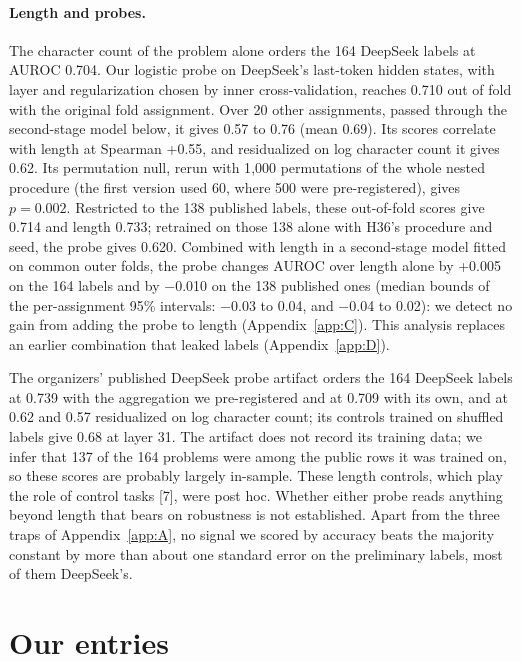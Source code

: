 \documentclass{article}
\begin{document}
\paragraph{Length and probes.} The character count of the problem alone orders the 164 DeepSeek labels at AUROC 0.704. Our logistic probe on DeepSeek's last-token hidden states, with layer and regularization chosen by inner cross-validation, reaches 0.710 out of fold with the original fold assignment. Over 20 other assignments, passed through the second-stage model below, it gives 0.57 to 0.76 (mean 0.69). Its scores correlate with length at Spearman +0.55, and residualized on log character count it gives 0.62. Its permutation null, rerun with 1{,}000 permutations of the whole nested procedure (the first version used 60, where 500 were pre-registered), gives $p = 0.002$. Restricted to the 138 published labels, these out-of-fold scores give 0.714 and length 0.733; retrained on those 138 alone with H36's procedure and seed, the probe gives 0.620. Combined with length in a second-stage model fitted on common outer folds, the probe changes AUROC over length alone by +0.005 on the 164 labels and by $-$0.010 on the 138 published ones (median bounds of the per-assignment 95\% intervals: $-$0.03 to 0.04, and $-$0.04 to 0.02): we detect no gain from adding the probe to length (Appendix~\ref{app:C}). This analysis replaces an earlier combination that leaked labels (Appendix~\ref{app:D}).

The organizers' published DeepSeek probe artifact orders the 164 DeepSeek labels at 0.739 with the aggregation we pre-registered and at 0.709 with its own, and at 0.62 and 0.57 residualized on log character count; its controls trained on shuffled labels give 0.68 at layer 31. The artifact does not record its training data; we infer that 137 of the 164 problems were among the public rows it was trained on, so these scores are probably largely in-sample. These length controls, which play the role of control tasks [7], were post hoc. Whether either probe reads anything beyond length that bears on robustness is not established. Apart from the three traps of Appendix~\ref{app:A}, no signal we scored by accuracy beats the majority constant by more than about one standard error on the preliminary labels, most of them DeepSeek's.

\section{Our entries}\label{sec:entries}
\end{document}
